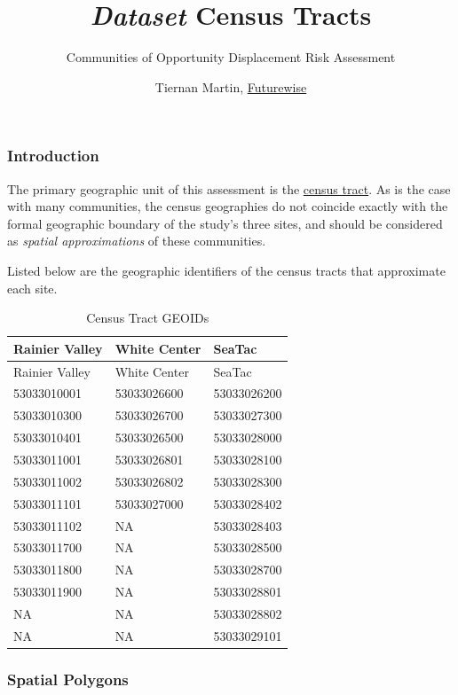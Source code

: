 \documentclass[]{article}
\title{\emph{Dataset} \textbar{} Census Tracts}
\subtitle{Communities of Opportunity Displacement Risk Assessment}
\author{Tiernan Martin, \href{http://www.futurewisewa.org/}{Futurewise}}
\date{}
\begin{document}
\maketitle

\subsubsection{Introduction}\label{introduction}

The primary geographic unit of this assessment is the
\href{https://www.census.gov/geo/reference/gtc/gtc_ct.html}{census
tract}. As is the case with many communities, the census geographies do
not coincide exactly with the formal geographic boundary of the study's
three sites, and should be considered as \emph{spatial approximations}
of these communities.

Listed below are the geographic identifiers of the census tracts that
approximate each site.

\begin{longtable}[]{@{}lll@{}}
\caption{Census Tract GEOIDs}\tabularnewline
\toprule
Rainier Valley & White Center & SeaTac\tabularnewline
\midrule
\endfirsthead
\toprule
Rainier Valley & White Center & SeaTac\tabularnewline
\midrule
\endhead
53033010001 & 53033026600 & 53033026200\tabularnewline
53033010300 & 53033026700 & 53033027300\tabularnewline
53033010401 & 53033026500 & 53033028000\tabularnewline
53033011001 & 53033026801 & 53033028100\tabularnewline
53033011002 & 53033026802 & 53033028300\tabularnewline
53033011101 & 53033027000 & 53033028402\tabularnewline
53033011102 & NA & 53033028403\tabularnewline
53033011700 & NA & 53033028500\tabularnewline
53033011800 & NA & 53033028700\tabularnewline
53033011900 & NA & 53033028801\tabularnewline
NA & NA & 53033028802\tabularnewline
NA & NA & 53033029101\tabularnewline
\bottomrule
\end{longtable}

\subsubsection{Spatial Polygons}\label{spatial-polygons}
\end{document}
